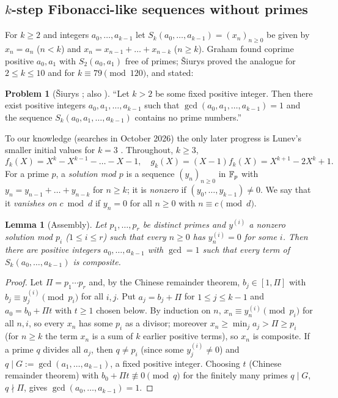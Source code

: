 \documentclass[11pt]{amsart}
\newtheorem{lemma}[theorem]{Lemma}
\theoremstyle{definition}
\newtheorem{problem}[theorem]{Problem}
\theoremstyle{remark}
\begin{document}
\subsection{\texorpdfstring{$k$}{k}-step Fibonacci-like sequences without primes}
\label{R6:subsec:siurys}

For $k\ge2$ and integers $a_0,\dots,a_{k-1}$ let $S_k(a_0,\dots,a_{k-1})=(x_n)_{n\ge0}$ be given by
$x_n=a_n$ ($n<k$) and $x_n=x_{n-1}+\dots+x_{n-k}$ ($n\ge k$). Graham \cite{R6-Graham} found coprime
positive $a_0,a_1$ with $S_2(a_0,a_1)$ free of primes; \v{S}iurys \cite{R6-Siurys} proved the analogue for
$2\le k\le10$ and for $k\equiv79\pmod{120}$, and stated:

\begin{problem}[\v{S}iurys {\cite[Conjecture~1]{R6-Siurys}}; also {\cite{R6-SiurysThesis}}]
\label{R6:prob:siurys}
``Let $k>2$ be some fixed positive integer. Then there exist positive integers
$a_0,a_1,\dots,a_{k-1}$ such that $\gcd(a_0,a_1,\dots,a_{k-1})=1$ and the sequence
$S_k(a_0,a_1,\dots,a_{k-1})$ contains no prime numbers.''
\end{problem}

To our knowledge (searches in October 2026) the only later progress is Lunev's smaller initial
values for $k=3$ \cite{R6-Lunev}. Throughout, $k\ge3$,
\[
f_k(X)=X^k-X^{k-1}-\dots-X-1,\quad g_k(X)=(X-1)f_k(X)=X^{k+1}-2X^k+1 .
\]
For a prime $p$, a \emph{solution mod $p$} is a sequence $(y_n)_{n\ge0}$ in $\mathbb{F}_p$ with
$y_n=y_{n-1}+\dots+y_{n-k}$ for $n\ge k$; it is \emph{nonzero} if $(y_0,\dots,y_{k-1})\ne0$. We say
that it \emph{vanishes on} $c\bmod d$ if $y_n=0$ for all $n\ge0$ with $n\equiv c\pmod d$.

\begin{lemma}[Assembly]\label{R6:lem:assembly}
Let $p_1,\dots,p_r$ be distinct primes and $y^{(i)}$ a nonzero solution mod $p_i$ ($1\le i\le r$)
such that every $n\ge0$ has $y^{(i)}_n=0$ for some $i$. Then there are positive integers
$a_0,\dots,a_{k-1}$ with $\gcd=1$ such that every term of $S_k(a_0,\dots,a_{k-1})$ is composite.
\end{lemma}
\begin{proof}
Let $\Pi=p_1\cdots p_r$ and, by the Chinese remainder theorem, $b_j\in[1,\Pi]$ with
$b_j\equiv y^{(i)}_j\pmod{p_i}$ for all $i,j$. Put $a_j=b_j+\Pi$ for $1\le j\le k-1$ and
$a_0=b_0+\Pi t$ with $t\ge1$ chosen below. By induction on $n$, $x_n\equiv y^{(i)}_n\pmod{p_i}$ for all
$n,i$, so every $x_n$ has some $p_i$ as a divisor; moreover $x_n\ge\min_ja_j>\Pi\ge p_i$ (for $n\ge k$
the term $x_n$ is a sum of $k$ earlier positive terms), so $x_n$ is composite. If a prime $q$ divides
all $a_j$, then $q\ne p_i$ (since some $y^{(i)}_j\ne0$) and $q\mid G:=\gcd(a_1,\dots,a_{k-1})$, a fixed
positive integer. Choosing $t$ (Chinese remainder theorem) with $b_0+\Pi t\not\equiv0\pmod q$ for the
finitely many primes $q\mid G$, $q\nmid\Pi$, gives $\gcd(a_0,\dots,a_{k-1})=1$.
\end{proof}
\end{document}

